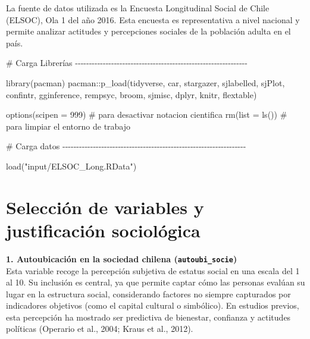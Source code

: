 \documentclass[
  11pt,
]{article}
\newenvironment{Shaded}{\begin{snugshade}}{\end{snugshade}}
\newcommand{\AttributeTok}[1]{\textcolor[rgb]{0.40,0.45,0.13}{#1}}
\newcommand{\CommentTok}[1]{\textcolor[rgb]{0.37,0.37,0.37}{#1}}
\newcommand{\DecValTok}[1]{\textcolor[rgb]{0.68,0.00,0.00}{#1}}
\newcommand{\FunctionTok}[1]{\textcolor[rgb]{0.28,0.35,0.67}{#1}}
\newcommand{\NormalTok}[1]{\textcolor[rgb]{0.00,0.23,0.31}{#1}}
\newcommand{\SpecialCharTok}[1]{\textcolor[rgb]{0.37,0.37,0.37}{#1}}
\newcommand{\StringTok}[1]{\textcolor[rgb]{0.13,0.47,0.30}{#1}}
\begin{document}
La fuente de datos utilizada es la Encuesta Longitudinal Social de Chile
(ELSOC), Ola 1 del año 2016. Esta encuesta es representativa a nivel
nacional y permite analizar actitudes y percepciones sociales de la
población adulta en el país.

\begin{Shaded}
\begin{Highlighting}[]
\CommentTok{\# Carga Librerías {-}{-}{-}{-}{-}{-}{-}{-}{-}{-}{-}{-}{-}{-}{-}{-}{-}{-}{-}{-}{-}{-}{-}{-}{-}{-}{-}{-}{-}{-}{-}{-}{-}{-}{-}{-}{-}{-}{-}{-}{-}{-}{-}{-}{-}{-}{-}{-}{-}{-}{-}{-}{-}{-}{-}{-}{-}{-}{-}{-}{-}{-}}

\FunctionTok{library}\NormalTok{(pacman)}
\NormalTok{pacman}\SpecialCharTok{::}\FunctionTok{p\_load}\NormalTok{(tidyverse,  }
\NormalTok{               car,}
\NormalTok{               stargazer,}
\NormalTok{               sjlabelled,}
\NormalTok{               sjPlot,      }
\NormalTok{               confintr,    }
\NormalTok{               gginference,  }
\NormalTok{               rempsyc,     }
\NormalTok{               broom,       }
\NormalTok{               sjmisc,      }
\NormalTok{               dplyr,}
\NormalTok{               knitr,}
\NormalTok{               flextable)           }

\FunctionTok{options}\NormalTok{(}\AttributeTok{scipen =} \DecValTok{999}\NormalTok{) }\CommentTok{\# para desactivar notacion cientifica}
\FunctionTok{rm}\NormalTok{(}\AttributeTok{list =} \FunctionTok{ls}\NormalTok{()) }\CommentTok{\# para limpiar el entorno de trabajo}


\CommentTok{\# Carga datos {-}{-}{-}{-}{-}{-}{-}{-}{-}{-}{-}{-}{-}{-}{-}{-}{-}{-}{-}{-}{-}{-}{-}{-}{-}{-}{-}{-}{-}{-}{-}{-}{-}{-}{-}{-}{-}{-}{-}{-}{-}{-}{-}{-}{-}{-}{-}{-}{-}{-}{-}{-}{-}{-}{-}{-}{-}{-}{-}{-}{-}{-}{-}{-}{-}{-}}

\FunctionTok{load}\NormalTok{(}\StringTok{"input/ELSOC\_Long.RData"}\NormalTok{)}
\end{Highlighting}
\end{Shaded}

\hypertarget{selecciuxf3n-de-variables-y-justificaciuxf3n-socioluxf3gica}{%
\section{Selección de variables y justificación
sociológica}\label{selecciuxf3n-de-variables-y-justificaciuxf3n-socioluxf3gica}}

\textbf{1. Autoubicación en la sociedad chilena
(\texttt{autoubi\_socie})}\\
Esta variable recoge la percepción subjetiva de estatus social en una
escala del 1 al 10. Su inclusión es central, ya que permite captar cómo
las personas evalúan su lugar en la estructura social, considerando
factores no siempre capturados por indicadores objetivos (como el
capital cultural o simbólico). En estudios previos, esta percepción ha
mostrado ser predictiva de bienestar, confianza y actitudes políticas
(Operario et al., 2004; Kraus et al., 2012).
\end{document}
